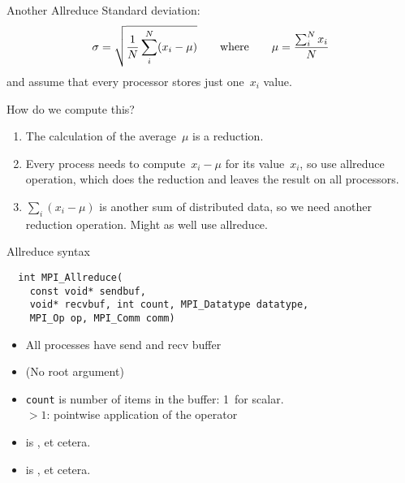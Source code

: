 \begin{numberedframe}{Another Allreduce}
Standard deviation:
\[ \sigma = \sqrt{\frac1N \sum_i^N (x_i-\mu) }
\qquad\hbox{where}\qquad \mu = \frac{\sum_i^Nx_i}N
\]
and assume that every processor stores just one~$x_i$ value.

How do we compute this?
\begin{enumerate}
\item<2-> The calculation of the average~$\mu$ is a reduction.
\item<3-> Every
  process needs to compute~$x_i-\mu$ for its value~$x_i$, so use
  allreduce operation, which does the reduction and leaves
  the result on all processors.
\item<4-> $\sum_i(x_i-\mu)$ is another sum of
  distributed data, so we need another reduction operation. Might as
  well use allreduce.
\end{enumerate}
\end{numberedframe}

\begin{numberedframe}{Allreduce syntax}
\begin{lstlisting}
  int MPI_Allreduce(
    const void* sendbuf,
    void* recvbuf, int count, MPI_Datatype datatype,
    MPI_Op op, MPI_Comm comm)  
\end{lstlisting}
\begin{itemize}
\item All processes have send and recv buffer
\item (No root argument)
\item \lstinline{count} is number of items in the buffer: 1~for scalar.\\
  $>1$: pointwise application of the operator
\item {} is ,  et cetera.
\item {} is ,  et cetera.
\end{itemize}
\end{numberedframe}


